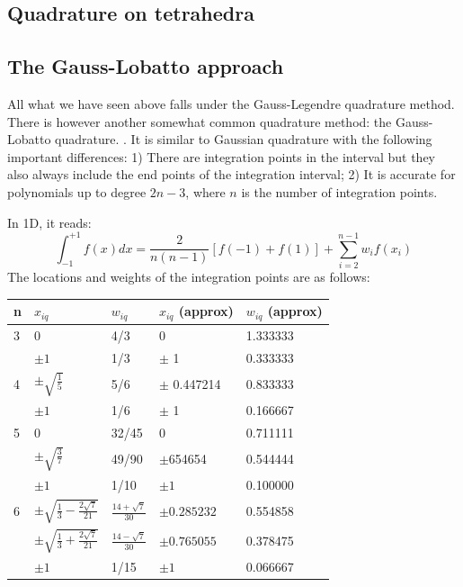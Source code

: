 \subsection{Quadrature on tetrahedra}




\subsection{The Gauss-Lobatto approach \label{sec:loba}}

All what we have seen above falls under the Gauss-Legendre quadrature method. 
There is however another somewhat common quadrature method: the Gauss-Lobatto 
quadrature. .
It is similar to Gaussian quadrature with the following important differences:
1) There are integration points in the interval but they also always include 
the end points of the integration interval;
2) It is accurate for polynomials up to degree $2n-3$, where $n$ is 
the number of integration points.

In 1D, it reads:
\[
\int_{-1}^{+1} f(x) dx = \frac{2}{n(n-1)} [f(-1)+f(1)] + \sum_{i=2}^{n-1} w_i f(x_i) 
\]
The locations and weights of the integration points are as follows:

\begin{center}
\begin{tabular}{lllll}
\hline
n & $x_{iq}$ & $w_{iq}$ & $x_{iq}$ (approx) & $w_{iq}$ (approx) \\
\hline\hline
3 & 0 & 4/3 & 0& 1.333333\\
  & $\pm 1$ & 1/3 & $\pm$ 1 & 0.333333 \\
\hline
4 & $\pm\sqrt{\frac{1}{5}}$ & 5/6 & $\pm$ 0.447214 & 0.833333 \\
  & $\pm 1$ & 1/6 & $\pm$ 1 & 0.166667\\
\hline
5 & 0 & 32/45 & 0 &  0.711111\\
  & $\pm\sqrt{\frac{3}{7}}$ & 49/90 & $\pm$654654 & 0.544444\\
  & $\pm 1$ & 1/10 & $\pm 1$& 0.100000\\
\hline
6 & $\pm\sqrt{\frac{1}{3} -\frac{2\sqrt{7}}{21}}$ & $\frac{14+\sqrt{7}}{30}$ & $\pm 0.285232$ & 0.554858 \\
  & $\pm\sqrt{\frac{1}{3} +\frac{2\sqrt{7}}{21}}$ & $\frac{14-\sqrt{7}}{30}$ & $\pm 0.765055$ & 0.378475\\
  & $\pm 1$ & 1/15  & $\pm 1$  &  0.066667\\
\hline
\end{tabular}
\end{center}

